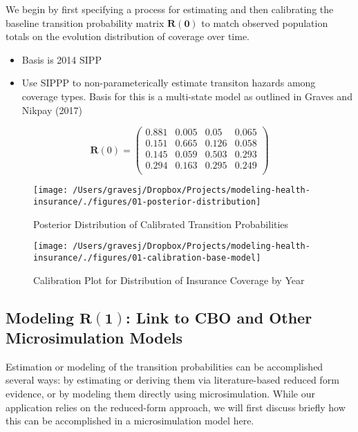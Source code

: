 \documentclass[
  10pt,
]{article}
\providecommand{\tightlist}{%
  \setlength{\itemsep}{0pt}\setlength{\parskip}{0pt}}
\begin{document}
We begin by first specifying a process for estimating and then
calibrating the baseline transition probability matrix
\(\boldsymbol{R(0)}\) to match observed population totals on the
evolution distribution of coverage over time.

\begin{itemize}
\tightlist
\item
  Basis is 2014 SIPP
\item
  Use SIPPP to non-parameterically estimate transiton hazards among
  coverage types. Basis for this is a multi-state model as outlined in
  Graves and Nikpay (2017)
\end{itemize}

\[
\boldsymbol{R}(0) = 
\begin{pmatrix}
0.881 & 0.005 & 0.05 & 0.065 \\
0.151 & 0.665 & 0.126 & 0.058 \\
0.145 & 0.059 & 0.503 & 0.293 \\
0.294 & 0.163 & 0.295 & 0.249 \\
\end{pmatrix}
\]

\begin{figure}
\texttt{[image: /Users/gravesj/Dropbox/Projects/modeling-health-insurance/./figures/01-posterior-distribution]} \caption{\label{posterior_calib}Posterior Distribution of Calibrated Transition Probabilities}\label{fig:unnamed-chunk-4}
\end{figure}

\begin{figure}
\texttt{[image: /Users/gravesj/Dropbox/Projects/modeling-health-insurance/./figures/01-calibration-base-model]} \caption{\label{posterior_calib}Calibration Plot for Distribution of Insurance Coverage by Year}\label{fig:unnamed-chunk-5}
\end{figure}

\hypertarget{modeling-boldsymbolr1-link-to-cbo-and-other-microsimulation-models}{%
\subsection{\texorpdfstring{Modeling \(\boldsymbol{R(1)}\): Link to CBO
and Other Microsimulation
Models}{Modeling \textbackslash boldsymbol\{R(1)\}: Link to CBO and Other Microsimulation Models}}\label{modeling-boldsymbolr1-link-to-cbo-and-other-microsimulation-models}}

Estimation or modeling of the transition probabilities can be
accomplished several ways: by estimating or deriving them via
literature-based reduced form evidence, or by modeling them directly
using microsimulation. While our application relies on the reduced-form
approach, we will first discuss briefly how this can be accomplished in
a microsimulation model here.
\end{document}
